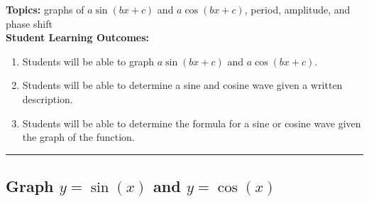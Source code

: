 
\noindent \textbf{Topics:}  graphs of $a\sin(bx+c)$ and $a\cos(bx+c)$, period, amplitude, and phase shift\\

\noindent \textbf{Student Learning Outcomes:}
\begin{enumerate}
\item Students will be able to graph $a\sin(bx+c)$ and $a\cos(bx+c)$.
\item Students will be able to determine a sine and cosine wave given a written description.
\item Students will be able to determine the formula for a sine or cosine wave given the graph of the function.
\end{enumerate}

\hrule 

\bigskip

\subsection{Graph $y=\sin(x)$ and $y=\cos(x)$} ~

